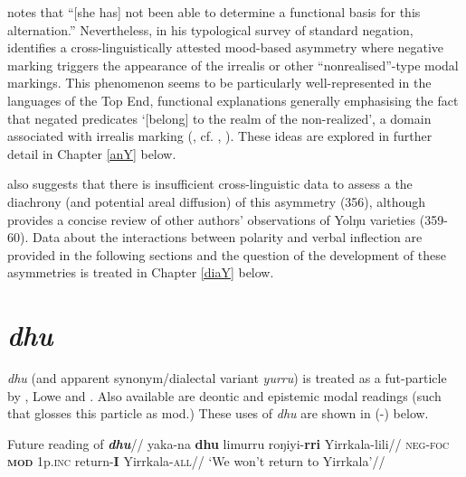 \citet[356]{Wilkinson1991} notes that ``[she has] not been able to determine a functional basis for this alternation.'' Nevertheless, in his typological survey of standard negation, \citet[558]{Miestamo2005} identifies a cross-linguistically attested mood-based asymmetry where negative marking triggers the appearance of the irrealis or other ``nonrealised''-type modal markings. This phenomenon seems to be particularly well-represented in the languages of the Top End, functional explanations generally emphasising the fact that negated predicates `[belong] to the realm of the non-realized', a domain associated with irrealis marking (\citealt[225]{Miestamo2005}, cf. \citealt[195]{McLellan1992}, \citealp[see also][]{Phillips2019}). These ideas are explored in further detail in Chapter \ref{anY} below.

\citet{Wilkinson1991} also suggests that there is insufficient cross-linguistic data to assess a the diachrony (and potential areal diffusion) of this asymmetry (356), although provides a concise review of other authors' observations of Yolŋu varieties (359-60). Data about the interactions between polarity and verbal inflection are provided in the following sections and the question of the development of these asymmetries is treated in Chapter \ref{diaY} below.


\section{\textit{dhu}}\label{dhu}

\textit{dhu} (and apparent synonym/dialectal variant \textit{yurru}) is treated as a \gls{fut}-particle by \citet[346]{Wilkinson1991}, Lowe and \citet[39,46]{Heath1980b}. Also available are deontic and epistemic modal readings (such that \citet[110]{VanderWal1992} glosses this particle as \gls{mod}.) These uses of \textit{dhu} are shown in (-) below.

\pex{}\begingl\glpreamble Future reading of \textit{\textbf{dhu}}//
\gla yaka-na \textbf{dhu} limurru roŋiyi-\textbf{rri} Yirrkala-lili//
\glb \textsc{neg-foc} \textsc{\textbf{mod}} 1p\textsc{.inc} return-\textbf{I} Yirrkala\textsc{-all}//
\glft`We won't return to Yirrkala'//\endgl\xe



